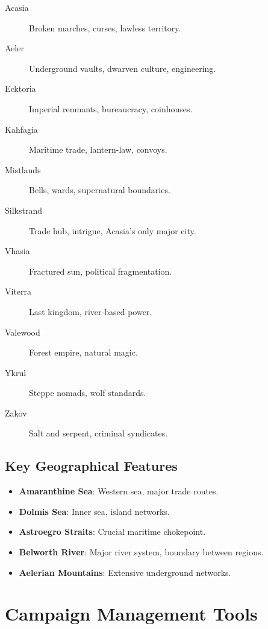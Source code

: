 \begin{description}
\item[Acasia] Broken marches, curses, lawless territory.
\item[Aeler] Underground vaults, dwarven culture, engineering.
\item[Ecktoria] Imperial remnants, bureaucracy, coinhouses.
\item[Kahfagia] Maritime trade, lantern-law, convoys.
\item[Mistlands] Bells, wards, supernatural boundaries.
\item[Silkstrand] Trade hub, intrigue, Acasia's only major city.
\item[Vhasia] Fractured sun, political fragmentation.
\item[Viterra] Last kingdom, river-based power.
\item[Valewood] Forest empire, natural magic.
\item[Ykrul] Steppe nomads, wolf standards.
\item[Zakov] Salt and serpent, criminal syndicates.
\end{description}

\subsection{Key Geographical Features}
\label{subsec:geography-ref}

\begin{itemize}
\item \textbf{Amaranthine Sea}: Western sea, major trade routes.
\item \textbf{Dolmis Sea}: Inner sea, island networks.
\item \textbf{Astroegro Straits}: Crucial maritime chokepoint.
\item \textbf{Belworth River}: Major river system, boundary between regions.
\item \textbf{Aelerian Mountains}: Extensive underground networks.
\end{itemize}

\section{Campaign Management Tools}
\label{sec:campaign-tools}

